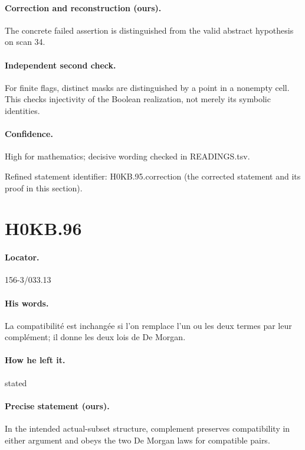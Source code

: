 \paragraph{Correction and reconstruction (ours).} The concrete failed assertion is distinguished from the valid abstract hypothesis on scan 34.

\paragraph{Independent second check.} For finite flags, distinct masks are distinguished by a point in a nonempty cell. This checks injectivity of the Boolean realization, not merely its symbolic identities.

\paragraph{Confidence.} High for mathematics; decisive wording checked in READINGS.tsv.

\noindent Refined statement identifier: H0KB.95.correction (the corrected statement and its proof in this section).

\section*{H0KB.96}\label{statement:H0KB.96}
\paragraph{Locator.} 156-3/033.13

\paragraph{His words.} La compatibilité est inchangée si l’on remplace l’un ou les deux termes par leur complément; il donne les deux lois de De Morgan.

\paragraph{How he left it.} stated

\paragraph{Precise statement (ours).} In the intended actual-subset structure, complement preserves compatibility in either argument and obeys the two De Morgan laws for compatible pairs.

